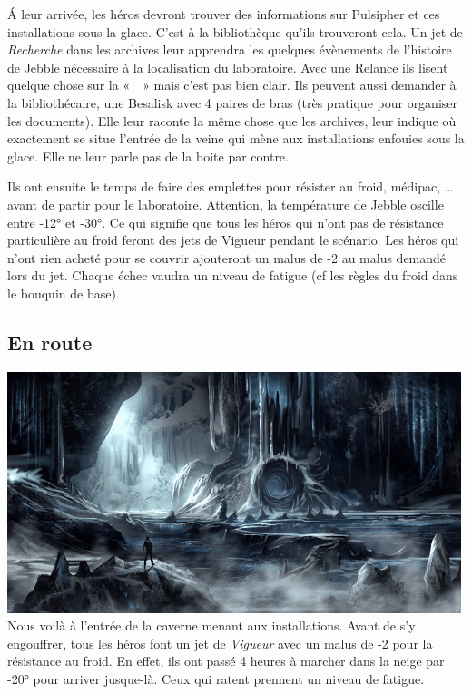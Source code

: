 \'A leur arrivée, les héros devront trouver des informations sur Pulsipher et ces installations sous la glace. C’est à la bibliothèque qu’ils trouveront cela. Un jet de \emph{Recherche} dans les archives leur apprendra les quelques évènements de l’histoire de Jebble nécessaire à la localisation du laboratoire. Avec une Relance ils lisent quelque chose sur la «~~» mais c’est pas bien clair. Ils peuvent aussi demander à la bibliothécaire, une Besalisk avec 4 paires de bras (très pratique pour organiser les documents). Elle leur raconte la même chose que les archives, leur indique où exactement se situe l’entrée de la veine qui mène aux installations enfouies sous la glace. Elle ne leur parle pas de la boite par contre.

Ils ont ensuite le temps de faire des emplettes pour résister au froid, médipac, \ldots avant de partir pour le laboratoire. Attention, la température de Jebble oscille entre -12° et -30°. Ce qui signifie que tous les héros qui n’ont pas de résistance particulière au froid feront des jets de Vigueur pendant le scénario. Les héros qui n’ont rien acheté pour se couvrir ajouteront un malus de -2 au malus demandé lors du jet. Chaque échec vaudra un niveau de fatigue (cf les règles du froid dans le bouquin de base).

\subsection{En route}
\noindent\includegraphics[width=\linewidth]{_img/places/jebble-cave.png}
Nous voilà à l’entrée de la caverne menant aux installations. Avant de s’y engouffrer, tous les héros font un jet de \emph{Vigueur} avec un malus de -2 pour la résistance au froid. En effet, ils ont passé 4 heures à marcher dans la neige par -20° pour arriver jusque-là. Ceux qui ratent prennent un niveau de fatigue.

